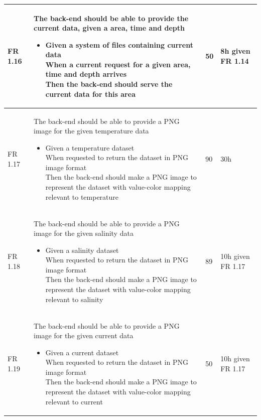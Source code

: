 \documentclass[11pt,a4paper,titlepage,oneside]{report}
\begin{document}
\begin{longtable}{p{1.4cm} p{7.8cm} p{1cm} p{1cm} }
  FR 1.16 & The \gls{back-end} should be able to provide the current data, given a area, time and depth
  \begin{itemize}
  \item \parbox[t]{6.8cm}{
        Given a system of files containing current data \\
        When a current request for a given area, time and depth arrives \\
        Then the \gls{back-end} should serve the current data for this area}
  \end{itemize}
  & 50 & 8h given FR 1.14 \\ \hline

  FR 1.17 & The \gls{back-end} should be able to provide a \gls{PNG} image for the given temperature data
  \begin{itemize}
  \item \parbox[t]{6.8cm}{
        Given a temperature dataset \\
        When requested to return the dataset in \gls{PNG} image format \\
        Then the \gls{back-end} should make a \gls{PNG} image to represent the dataset with value-color mapping relevant to temperature}
  \end{itemize}
  & 90 & 30h \\ \hline

  FR 1.18 & The \gls{back-end} should be able to provide a \gls{PNG} image for the given salinity data
  \begin{itemize}
  \item \parbox[t]{6.8cm}{
        Given a salinity dataset \\
        When requested to return the dataset in \gls{PNG} image format \\
        Then the \gls{back-end} should make a \gls{PNG} image to represent the dataset with value-color mapping relevant to salinity}
  \end{itemize}
  & 89 & 10h given FR 1.17 \\ \hline

  FR 1.19 & The \gls{back-end} should be able to provide a \gls{PNG} image for the given current data
  \begin{itemize}
  \item \parbox[t]{6.8cm}{
        Given a current dataset \\
        When requested to return the dataset in \gls{PNG} image format \\
        Then the \gls{back-end} should make a \gls{PNG} image to represent the dataset with value-color mapping relevant to current}
  \end{itemize}
  & 50 & 10h given FR 1.17  \\ \hline


\end{longtable}
\end{document}
